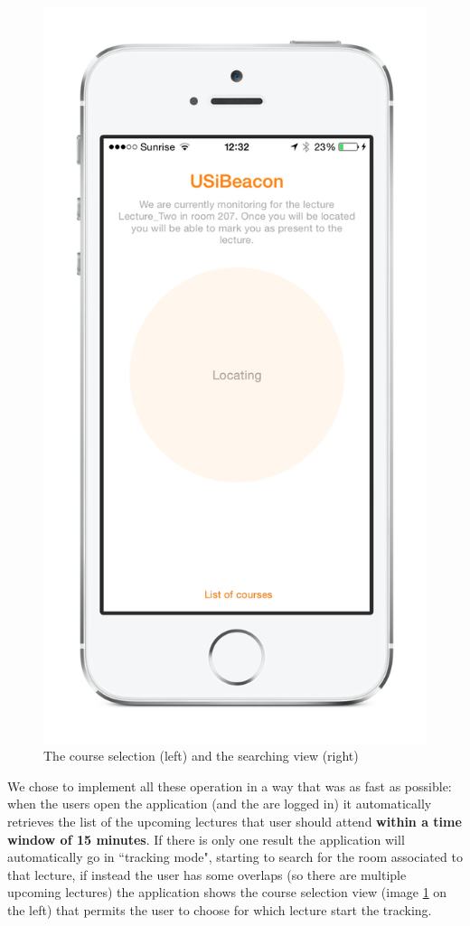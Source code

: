 \begin{figure}[htbp]
\begin{center}
\includegraphics[scale=0.5]{img/iphone_locating.png}
\caption{The course selection (left) and the searching view (right)}
\label{courseselection}
\end{center}
\end{figure}

We chose to implement all these operation in a way that was as fast as possible: when the users open the application (and the are logged in) it automatically retrieves the list of the upcoming lectures that user should attend \textbf{within a time window of 15 minutes}.
If there is only one result the application will automatically go in ``tracking mode", starting to search for the room associated to that lecture, if instead the user has some overlaps (so there are multiple upcoming lectures) the application shows the course selection view (image \ref{courseselection} on the left) that permits the user to choose for which lecture start the tracking.\\

